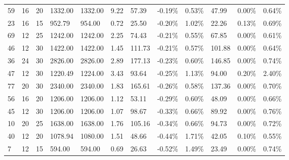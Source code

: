 \documentclass[../main]{subfiles}
\begin{document}
\begin{longtable}{l|ll|lll|lll|lll}
   59 & 16                         & 20                         & 1332.00                   & 1332.00  & 9.22                & 57.39  & -0.19\% & 0.53\% & 47.99  & 0.00\%  & 0.64\% \\
   23 & 16                         & 15                         & 952.79                    & 954.00   & 0.72                & 25.50  & -0.20\% & 1.02\% & 22.26  & 0.13\%  & 0.69\% \\
   69 & 12                         & 25                         & 1242.00                   & 1242.00  & 2.25                & 74.43  & -0.21\% & 0.55\% & 67.85  & 0.00\%  & 0.61\% \\
   46 & 12                         & 30                         & 1422.00                   & 1422.00  & 1.45                & 111.73 & -0.21\% & 0.57\% & 101.88 & 0.00\%  & 0.64\% \\
   36 & 24                         & 30                         & 2826.00                   & 2826.00  & 2.89                & 177.13 & -0.23\% & 0.60\% & 146.85 & 0.00\%  & 0.74\% \\
   47 & 12                         & 30                         & 1220.49                   & 1224.00  & 3.43                & 93.64  & -0.25\% & 1.13\% & 94.00  & 0.20\%  & 2.40\% \\
   77 & 20                         & 30                         & 2340.00                   & 2340.00  & 1.83                & 165.61 & -0.26\% & 0.58\% & 137.36 & 0.00\%  & 0.70\% \\
   56 & 16                         & 20                         & 1206.00                   & 1206.00  & 1.12                & 53.11  & -0.29\% & 0.60\% & 48.09  & 0.00\%  & 0.66\% \\
   45 & 12                         & 30                         & 1206.00                   & 1206.00  & 1.07                & 98.67  & -0.33\% & 0.66\% & 89.92  & 0.00\%  & 0.76\% \\
   10 & 20                         & 25                         & 1638.00                   & 1638.00  & 1.76                & 105.16 & -0.34\% & 0.66\% & 94.73  & 0.00\%  & 0.72\% \\
   40 & 12                         & 20                         & 1078.94                   & 1080.00  & 1.51                & 48.66  & -0.44\% & 1.71\% & 42.05  & 0.10\%  & 0.55\% \\
   7  & 12                         & 15                         & 594.00                    & 594.00   & 0.69                & 26.63  & -0.52\% & 1.49\% & 23.49  & 0.00\%  & 0.74\% \\

\end{longtable}
\end{document}
